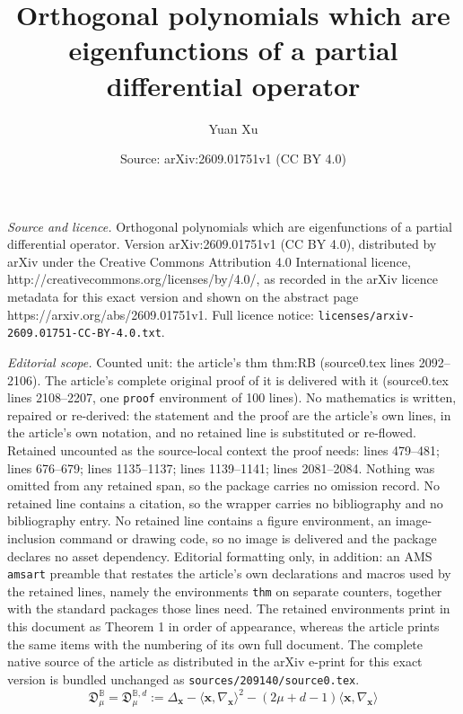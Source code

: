 \documentclass[10pt,a4paper]{amsart}
\title{Orthogonal polynomials which are eigenfunctions of a partial differential operator}
\author{Yuan Xu}
\date{Source: arXiv:2609.01751v1 (CC BY 4.0)}
\def\BB{{\mathbb B}}
\def\fD{{\mathfrak D}}
\def\la{{\langle}}
\def\ra{{\rangle}}
\begin{document}
\maketitle

\noindent\emph{Source and licence.} Orthogonal polynomials which are eigenfunctions of a partial differential operator. Version arXiv:2609.01751v1 (CC BY 4.0), distributed by arXiv under the Creative Commons Attribution 4.0 International licence, http://creativecommons.org/licenses/by/4.0/, as recorded in the arXiv licence metadata for this exact version and shown on the abstract page https://arxiv.org/abs/2609.01751v1. Full licence notice: \texttt{licenses/arxiv-2609.01751-CC-BY-4.0.txt}.\par\smallskip

\noindent\textit{Editorial scope.} Counted unit: the article's thm thm:RB (source0.tex lines 2092--2106). The article's complete original proof of it is delivered with it (source0.tex lines 2108--2207, one \texttt{proof} environment of 100 lines). No mathematics is written, repaired or re-derived: the statement and the proof are the article's own lines, in the article's own notation, and no retained line is substituted or re-flowed.  Retained uncounted as the source-local context the proof needs: lines 479--481; lines 676--679; lines 1135--1137; lines 1139--1141; lines 2081--2084.  Nothing was omitted from any retained span, so the package carries no omission record.  No retained line contains a citation, so the wrapper carries no bibliography and no bibliography entry.  No retained line contains a figure environment, an image-inclusion command or drawing code, so no image is delivered and the package declares no asset dependency.  Editorial formatting only, in addition: an AMS \texttt{amsart} preamble that restates the article's own declarations and macros used by the retained lines, namely the environments \texttt{thm} on separate counters, together with the standard packages those lines need.  The retained environments print in this document as Theorem 1 in order of appearance, whereas the article prints the same items with the numbering of its own full document.  The complete native source of the article as distributed in the arXiv e-print for this exact version is bundled unchanged as \texttt{sources/209140/source0.tex}.
\begin{equation} \label{eq:Diff-ball}
\fD_\mu^{\BB} = \fD_\mu^{\BB,d} :=  \Delta_{\bm x} - \la \bm x, \nabla_{\bm x}\ra ^2 - (2\mu + d-1) \la \bm x, \nabla_{\bm x} \ra  
\end{equation}
\end{document}

